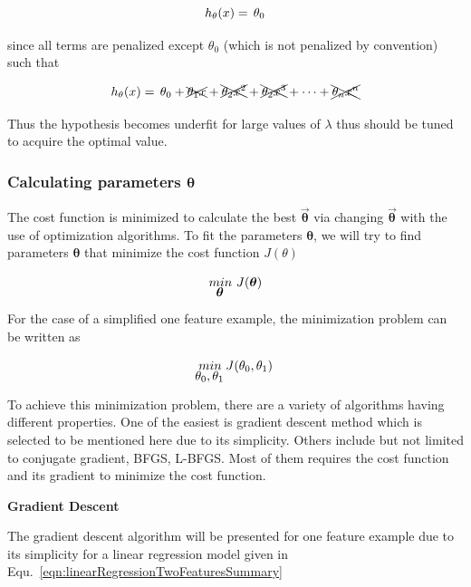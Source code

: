 \begin{equation}{\label{eqn:costFuncRegularizedTooMuch}}
h_\theta(x)
=\,
\theta_0 
\end{equation} 

since all terms are penalized except $\theta_0$ (which is not penalized by convention) such that

\begin{equation}{\label{eqn:costFuncRegularizedTooMuchHow}}
h_\theta(x)
=\,
\theta_0 + \xcancel{\theta_1 x}  + \xcancel{\theta_2 x^2}  + \xcancel{\theta_2 x^3}  + \cdots + \xcancel{\theta_n x^n}
\end{equation} 

Thus the hypothesis becomes underfit for large values of $\lambda$ thus should be tuned to acquire the optimal value.

\subsubsection{Calculating parameters $\bm{\theta}$}

The cost function is minimized to calculate the best $\vec{\bm{\theta}}$ via changing $\vec{\bm{\theta}}$ with the use of optimization algorithms. To fit the parameters $\bm{\theta}$, we will try to find parameters $\bm{\theta}$ that minimize the cost function $J(\theta)$

\begin{equation}{\label{eqn:optimizationGoal}}
\underaccent{{\displaystyle \bm{\theta}}}{min} \ J(\bm{\theta})
\end{equation} 

For the case of a simplified one feature example, the minimization problem can be written as

\begin{equation}{\label{eqn:optimizationGoalSimplified}}
\underaccent{{\displaystyle \theta_0, \theta_1}}{min} \ J(\theta_0,\theta_1)
\end{equation} 

To achieve this minimization problem, there are a variety of algorithms having different properties. 
One of the easiest is gradient descent method which is selected to be mentioned here due to its simplicity.  Others include but not limited to conjugate gradient, BFGS, L-BFGS. 
Most of them requires the cost function and its gradient to minimize the cost function. 

\textbf{Gradient Descent}

The gradient descent algorithm will be presented for one feature example due to its simplicity for a linear regression model given in Equ.~\ref{eqn:linearRegressionTwoFeaturesSummary}

